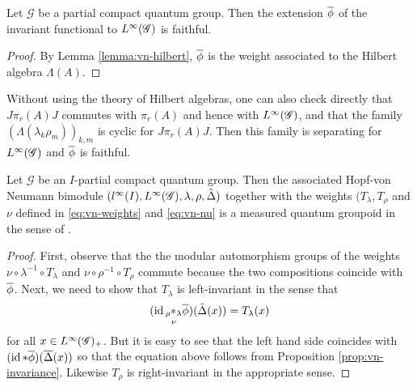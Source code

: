 \begin{Prop} \label{prop:hilbert-algebra} Let $\mathscr{G}$ be a
  partial compact quantum group. Then the extension $\overline{\phi}$ of the
  invariant functional to $L^{\infty}(\mathscr{G})$ is faithful.
\end{Prop}
\begin{proof}
  By Lemma \ref{lemma:vn-hilbert}, $\overline{\phi}$ is the weight associated
  to the Hilbert algebra $\Lambda(A)$. 
\end{proof}
\begin{Rem}
  Without using the theory of Hilbert algebras, one can also check
  directly that $J\pi_{r}(A)J$ commutes with $\pi_{r}(A)$ and hence
  with $L^{\infty}(\mathscr{G})$, and that the family
  $(\Lambda(\lambda_{k}\rho_{m}))_{k,m}$ is cyclic for
  $J\pi_{r}(A)J$. Then this family is separating for $L^{\infty}(\mathscr{G})$ and
  $\overline{\phi}$ is faithful.
\end{Rem}
\begin{Theorem} \label{theorem:vn-measured}
Let $\mathscr{G}$ be an $I$-partial compact quantum group. Then the
associated Hopf-von Neumann bimodule
$(l^{\infty}(I),L^{\infty}(\mathscr{G}),\lambda,\rho,\tilde\Delta)$ together with the weights
    $(T_{\lambda},T_{\rho}$ and $\nu$ defined in
    \eqref{eq:vn-weights} and \eqref{eq:vn-nu}
  is a measured quantum groupoid in the sense of \cite{enock:action}.
\end{Theorem}
\begin{proof}
  First, observe that the  the modular
  automorphism groups of the weights $\nu \circ \lambda^{-1} \circ
  T_{\lambda}$ and $\nu \circ \rho^{-1} \circ T_{\rho}$ commute  because the two
  compositions coincide with $\overline{\phi}$. Next, we need  to show that
  $T_{\lambda}$ is left-invariant in the sense that
  \begin{align*}
   (\operatorname{id} \underset{\nu}{_{\rho}\ast_{\lambda}} \overline{\phi})(\tilde\Delta(x)) = T_{\lambda}(x) 
  \end{align*}
for all $x\in L^{\infty}(\mathscr{G})_{+}$. But it is easy to see that the left hand
side coincides with   $(\operatorname{id} \ast \overline{\phi})(\overline{\Delta}(x))$ so that the
equation above follows from Proposition
\ref{prop:vn-invariance}. Likewise $T_{\rho}$ is right-invariant in
the appropriate sense.
\end{proof}


